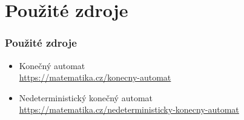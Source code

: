 \documentclass[hyperref={unicode}]{beamer}
\begin{document}
\section{Použité zdroje}

\begin{frame}
\frametitle{Použité zdroje}

\begin{itemize}
\item Konečný automat \\ {\footnotesize \url{https://matematika.cz/konecny-automat}}
\item Nedeterministický konečný automat \\ {\footnotesize \url{https://matematika.cz/nedeterministicky-konecny-automat}}
\end{itemize}
\end{frame}
\end{document}
